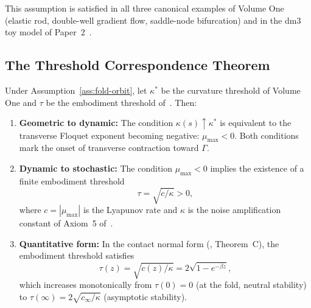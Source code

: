 This assumption is satisfied in all three canonical examples of
Volume One (elastic rod, double-well gradient flow, saddle-node
bifurcation) and in the dm3 toy model of Paper~2~\cite{Paper2}.

\subsection{The Threshold Correspondence Theorem}
\label{subsec:main-theorem}

\begin{theorem}
\label{thm:threshold}
Under Assumption~\ref{ass:fold-orbit}, let $\kappa^*$ be the
curvature threshold of Volume One and $\tau$ be the embodiment
threshold of~\cite{Paper1}. Then:
\begin{enumerate}[label=\textup{(\roman*)}]
  \item \textbf{Geometric to dynamic:} The condition
        $\kappa(s)\uparrow\kappa^*$ is equivalent to the
        transverse Floquet exponent becoming negative:
        $\mu_{\max}<0$. Both conditions mark the onset of
        transverse contraction toward $\Gamma$.
  \item \textbf{Dynamic to stochastic:} The condition
        $\mu_{\max}<0$ implies the existence of a finite
        embodiment threshold
        \[
          \tau = \sqrt{c/\kappa} > 0,
        \]
        where $c=|\mu_{\max}|$ is the Lyapunov rate and
        $\kappa$ is the noise amplification constant of
        Axiom~5 of~\cite{Paper1}.
  \item \textbf{Quantitative form:} In the contact normal form
        \textup{(\cite{Paper1}, Theorem~C)}, the embodiment
        threshold satisfies
        \[
          \tau(z) = \sqrt{c(z)/\kappa}
          = 2\sqrt{1-e^{-\beta z}},
        \]
        which increases monotonically from $\tau(0)=0$
        (at the fold, neutral stability) to
        $\tau(\infty) = 2\sqrt{c_\infty/\kappa}$
        (asymptotic stability).
\end{enumerate}
\end{theorem}

